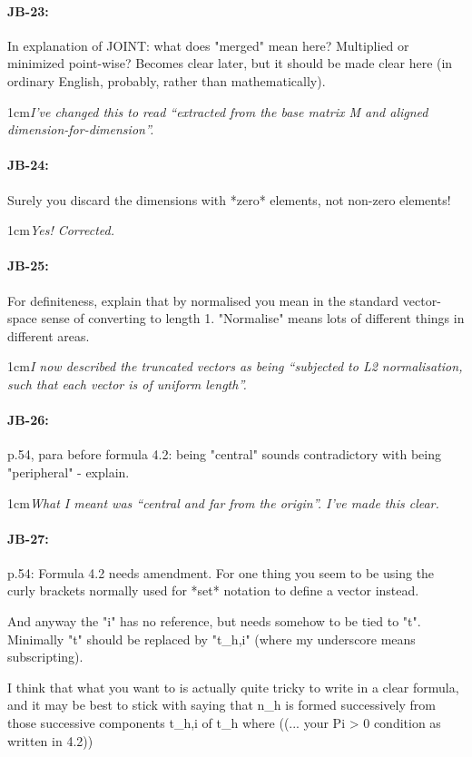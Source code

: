 \documentclass[11pt,a4paper]{article}
\newcommand{\res}[1]{\vspace{0.25cm} \begin{adjustwidth}{1cm}{}\emph{#1}\end{adjustwidth}}
\begin{document}
\paragraph{JB-23:} In explanation of JOINT: what does "merged" mean here? Multiplied or minimized point-wise? Becomes clear later, but it should be made clear here (in ordinary English, probably, rather than mathematically).

\res{I've changed this to read ``extracted from the base matrix M and aligned dimension-for-dimension''.}

\paragraph{JB-24:} Surely you discard the dimensions with *zero* elements, not non-zero elements!

\res{Yes!  Corrected.}

\paragraph{JB-25:} For definiteness, explain that by normalised you mean in the standard vector-space sense of converting to length 1. "Normalise" means lots of different things in different areas.

\res{I now described the truncated vectors as being ``subjected to L2 normalisation, such that each vector is of uniform length''.}

\paragraph{JB-26:} p.54, para before formula 4.2: being "central" sounds contradictory with being "peripheral" - explain.

\res{What I meant was ``central and far from the origin''.  I've made this clear.}

\paragraph{JB-27:} p.54: Formula 4.2 needs amendment. For one thing you seem to be using the curly brackets normally used for *set* notation to define a vector instead.

And anyway the "i" has no reference, but needs somehow to be tied to "t". Minimally "t" should be replaced by "t\_h,i" (where my underscore means subscripting).

I think that what you want to is actually quite tricky to write in a clear formula, and it may be best to stick with saying that n\_h is formed successively from those successive components t\_h,i of t\_h where ((... your Pi > 0 condition as written in 4.2))
\end{document}
